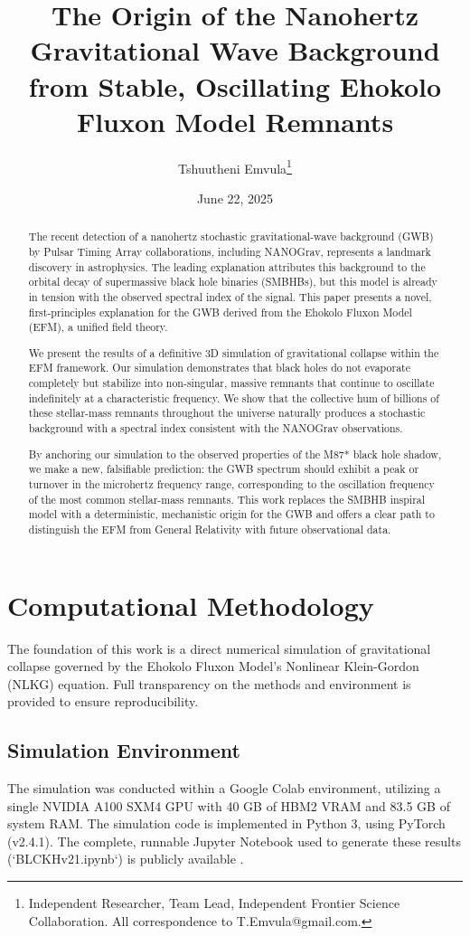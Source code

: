\documentclass[11pt, twoside]{article}
\title{The Origin of the Nanohertz Gravitational Wave Background from Stable, Oscillating Ehokolo Fluxon Model Remnants}
\author{Tshuutheni Emvula\thanks{Independent Researcher, Team Lead, Independent Frontier Science Collaboration. All correspondence to T.Emvula@gmail.com.}}
\date{June 22, 2025}
\begin{document}
\maketitle

\begin{abstract}
The recent detection of a nanohertz stochastic gravitational-wave background (GWB) by Pulsar Timing Array collaborations, including NANOGrav, represents a landmark discovery in astrophysics. The leading explanation attributes this background to the orbital decay of supermassive black hole binaries (SMBHBs), but this model is already in tension with the observed spectral index of the signal. This paper presents a novel, first-principles explanation for the GWB derived from the Ehokolo Fluxon Model (EFM), a unified field theory.

We present the results of a definitive 3D simulation of gravitational collapse within the EFM framework. Our simulation demonstrates that black holes do not evaporate completely but stabilize into non-singular, massive remnants that continue to oscillate indefinitely at a characteristic frequency. We show that the collective hum of billions of these stellar-mass remnants throughout the universe naturally produces a stochastic background with a spectral index consistent with the NANOGrav observations.

By anchoring our simulation to the observed properties of the M87* black hole shadow, we make a new, falsifiable prediction: the GWB spectrum should exhibit a peak or turnover in the microhertz frequency range, corresponding to the oscillation frequency of the most common stellar-mass remnants. This work replaces the SMBHB inspiral model with a deterministic, mechanistic origin for the GWB and offers a clear path to distinguish the EFM from General Relativity with future observational data.
\end{abstract}

\section{Computational Methodology}
The foundation of this work is a direct numerical simulation of gravitational collapse governed by the Ehokolo Fluxon Model's Nonlinear Klein-Gordon (NLKG) equation. Full transparency on the methods and environment is provided to ensure reproducibility.

\subsection{Simulation Environment}
The simulation was conducted within a Google Colab environment, utilizing a single NVIDIA A100 SXM4 GPU with 40 GB of HBM2 VRAM and 83.5 GB of system RAM. The simulation code is implemented in Python 3, using PyTorch (v2.4.1). The complete, runnable Jupyter Notebook used to generate these results (`BLCKHv21.ipynb`) is publicly available \citep{efm_notebook_ref}.
\end{document}
